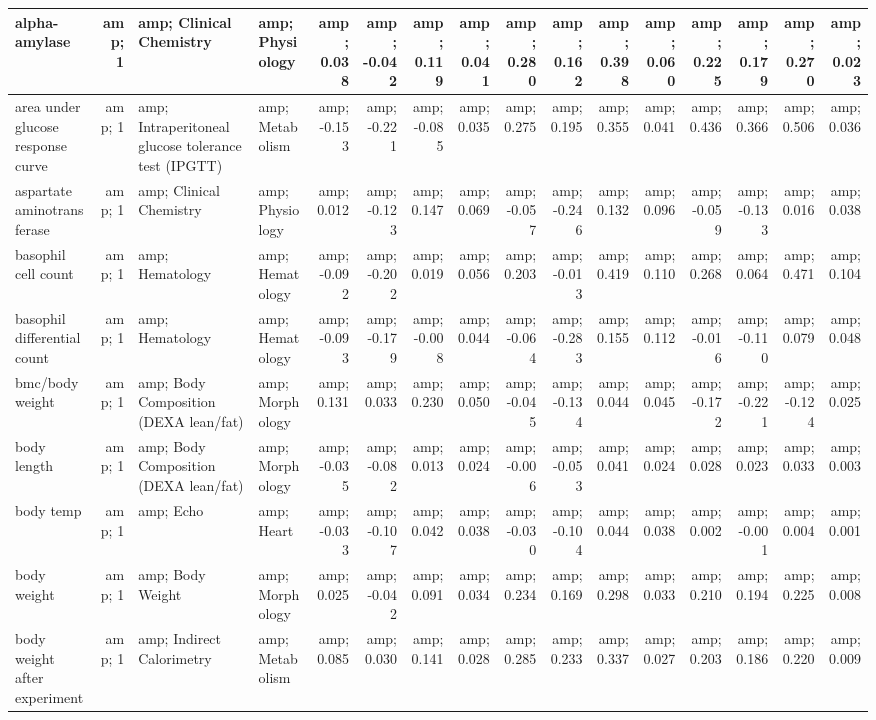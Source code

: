 \documentclass[]{article}
\begin{document}
\begin{table}
\begin{tabular}[t]{l|r|l|l|r|r|r|r|r|r|r|r|r|r|r|r}
\hline
alpha-amylase &amp; 1 &amp; Clinical Chemistry &amp; Physiology &amp; 0.038 &amp; -0.042 &amp; 0.119 &amp; 0.041 &amp; 0.280 &amp; 0.162 &amp; 0.398 &amp; 0.060 &amp; 0.225 &amp; 0.179 &amp; 0.270 &amp; 0.023\\
\hline
area under glucose response curve &amp; 1 &amp; Intraperitoneal glucose tolerance test (IPGTT) &amp; Metabolism &amp; -0.153 &amp; -0.221 &amp; -0.085 &amp; 0.035 &amp; 0.275 &amp; 0.195 &amp; 0.355 &amp; 0.041 &amp; 0.436 &amp; 0.366 &amp; 0.506 &amp; 0.036\\
\hline
aspartate aminotransferase &amp; 1 &amp; Clinical Chemistry &amp; Physiology &amp; 0.012 &amp; -0.123 &amp; 0.147 &amp; 0.069 &amp; -0.057 &amp; -0.246 &amp; 0.132 &amp; 0.096 &amp; -0.059 &amp; -0.133 &amp; 0.016 &amp; 0.038\\
\hline
basophil cell count &amp; 1 &amp; Hematology &amp; Hematology &amp; -0.092 &amp; -0.202 &amp; 0.019 &amp; 0.056 &amp; 0.203 &amp; -0.013 &amp; 0.419 &amp; 0.110 &amp; 0.268 &amp; 0.064 &amp; 0.471 &amp; 0.104\\
\hline
basophil differential count &amp; 1 &amp; Hematology &amp; Hematology &amp; -0.093 &amp; -0.179 &amp; -0.008 &amp; 0.044 &amp; -0.064 &amp; -0.283 &amp; 0.155 &amp; 0.112 &amp; -0.016 &amp; -0.110 &amp; 0.079 &amp; 0.048\\
\hline
bmc/body weight &amp; 1 &amp; Body Composition (DEXA lean/fat) &amp; Morphology &amp; 0.131 &amp; 0.033 &amp; 0.230 &amp; 0.050 &amp; -0.045 &amp; -0.134 &amp; 0.044 &amp; 0.045 &amp; -0.172 &amp; -0.221 &amp; -0.124 &amp; 0.025\\
\hline
body length &amp; 1 &amp; Body Composition (DEXA lean/fat) &amp; Morphology &amp; -0.035 &amp; -0.082 &amp; 0.013 &amp; 0.024 &amp; -0.006 &amp; -0.053 &amp; 0.041 &amp; 0.024 &amp; 0.028 &amp; 0.023 &amp; 0.033 &amp; 0.003\\
\hline
body temp &amp; 1 &amp; Echo &amp; Heart &amp; -0.033 &amp; -0.107 &amp; 0.042 &amp; 0.038 &amp; -0.030 &amp; -0.104 &amp; 0.044 &amp; 0.038 &amp; 0.002 &amp; -0.001 &amp; 0.004 &amp; 0.001\\
\hline
body weight &amp; 1 &amp; Body Weight &amp; Morphology &amp; 0.025 &amp; -0.042 &amp; 0.091 &amp; 0.034 &amp; 0.234 &amp; 0.169 &amp; 0.298 &amp; 0.033 &amp; 0.210 &amp; 0.194 &amp; 0.225 &amp; 0.008\\
\hline
body weight after experiment &amp; 1 &amp; Indirect Calorimetry &amp; Metabolism &amp; 0.085 &amp; 0.030 &amp; 0.141 &amp; 0.028 &amp; 0.285 &amp; 0.233 &amp; 0.337 &amp; 0.027 &amp; 0.203 &amp; 0.186 &amp; 0.220 &amp; 0.009\\

\end{tabular}
\end{table}
\end{document}
